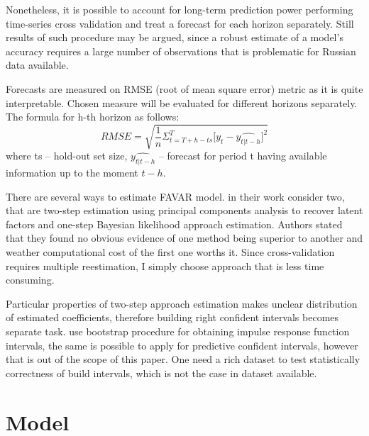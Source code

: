 \documentclass[a4paper, 14pt]{article}
\begin{document}
Nonetheless, it is possible to account for long-term prediction power performing time-series cross validation and treat a forecast for each horizon separately. Still results of such procedure may be argued, since a robust estimate of a model's accuracy requires a large number of observations that is problematic for Russian data available. 

Forecasts are measured on RMSE (root of mean square error) metric
as it is quite interpretable. Chosen measure will be evaluated for different horizons separately. The formula for h-th horizon as follows:
\[
	RMSE = 
	\sqrt{
		\frac{1}{n}
		\Sigma_{t= T + h - ts}^{T}
			\Big[
			y_t - \widehat{y_{t|t-h}}
			\Big]^2}
\] where ts -- hold-out set size, $\widehat{y_{t|t-h}}$ -- forecast for period t having available information up to the moment $t-h$.


There are several ways to estimate FAVAR model. \cite{bernanke2005measuring} in their work consider two, that are two-step estimation using principal components analysis to recover latent factors and one-step Bayesian likelihood approach estimation. Authors stated that they found no obvious evidence of one method being superior to another and weather computational cost of the first one worths it. Since cross-validation requires multiple reestimation, I simply choose approach that is less time consuming. 

Particular properties of two-step approach estimation makes unclear distribution of estimated coefficients, therefore building right confident intervals becomes separate task. \cite{bernanke2005measuring} use bootstrap procedure for obtaining impulse response function intervals, the same is possible to apply for predictive confident intervals, however that is out of the scope of this paper. One need a rich dataset to test statistically correctness of build intervals, which is not the case in dataset available.

\section{Model}
\end{document}

